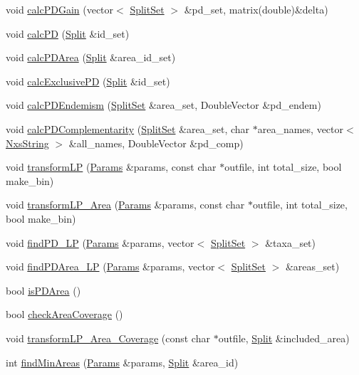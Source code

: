 \begin{DoxyCompactItemize}
\item 
void \hyperlink{classPDNetwork_a49a2c3d1f88418aefe5c254cb1d54c03}{calcPDGain} (vector$<$ \hyperlink{classSplitSet}{SplitSet} $>$ \&pd\_\-set, matrix(double)\&delta)
\item 
void \hyperlink{classPDNetwork_a4921770ad17b4d871726b0f118386bcf}{calcPD} (\hyperlink{classSplit}{Split} \&id\_\-set)
\item 
void \hyperlink{classPDNetwork_ae591e54724f7d6f31b0b1ba264bfb876}{calcPDArea} (\hyperlink{classSplit}{Split} \&area\_\-id\_\-set)
\item 
void \hyperlink{classPDNetwork_a0500f181c9b5f1d42812794a7ece40c4}{calcExclusivePD} (\hyperlink{classSplit}{Split} \&id\_\-set)
\item 
void \hyperlink{classPDNetwork_ae578ebf3ba8d3dff2275b7961abd9574}{calcPDEndemism} (\hyperlink{classSplitSet}{SplitSet} \&area\_\-set, DoubleVector \&pd\_\-endem)
\item 
void \hyperlink{classPDNetwork_aff4ede123b2e4460a44d43fc504427ca}{calcPDComplementarity} (\hyperlink{classSplitSet}{SplitSet} \&area\_\-set, char $\ast$area\_\-names, vector$<$ \hyperlink{classNxsString}{NxsString} $>$ \&all\_\-names, DoubleVector \&pd\_\-comp)
\item 
void \hyperlink{classPDNetwork_aab6e6faf6c987ce8a4c5780b02774503}{transformLP} (\hyperlink{structParams}{Params} \&params, const char $\ast$outfile, int total\_\-size, bool make\_\-bin)
\item 
void \hyperlink{classPDNetwork_a0845b62f009a89057f045019dc547ff2}{transformLP\_\-Area} (\hyperlink{structParams}{Params} \&params, const char $\ast$outfile, int total\_\-size, bool make\_\-bin)
\item 
void \hyperlink{classPDNetwork_aa86d84304ea9865f0a97f1329057b6ad}{findPD\_\-LP} (\hyperlink{structParams}{Params} \&params, vector$<$ \hyperlink{classSplitSet}{SplitSet} $>$ \&taxa\_\-set)
\item 
void \hyperlink{classPDNetwork_ab7529ca69f5a56de23aae6853276dec7}{findPDArea\_\-LP} (\hyperlink{structParams}{Params} \&params, vector$<$ \hyperlink{classSplitSet}{SplitSet} $>$ \&areas\_\-set)
\item 
bool \hyperlink{classPDNetwork_a4b01aead98ff4ffc2f4ad1b020ffaa39}{isPDArea} ()
\item 
bool \hyperlink{classPDNetwork_aa7a36298000e66475cbd4f4ceab2f662}{checkAreaCoverage} ()
\item 
void \hyperlink{classPDNetwork_a02a5df18864c94bef7bbbfa0f5f7c80b}{transformLP\_\-Area\_\-Coverage} (const char $\ast$outfile, \hyperlink{classSplit}{Split} \&included\_\-area)
\item 
int \hyperlink{classPDNetwork_ad5c5c01afa0f14529d2b798670c8ce25}{findMinAreas} (\hyperlink{structParams}{Params} \&params, \hyperlink{classSplit}{Split} \&area\_\-id)
\end{DoxyCompactItemize}
